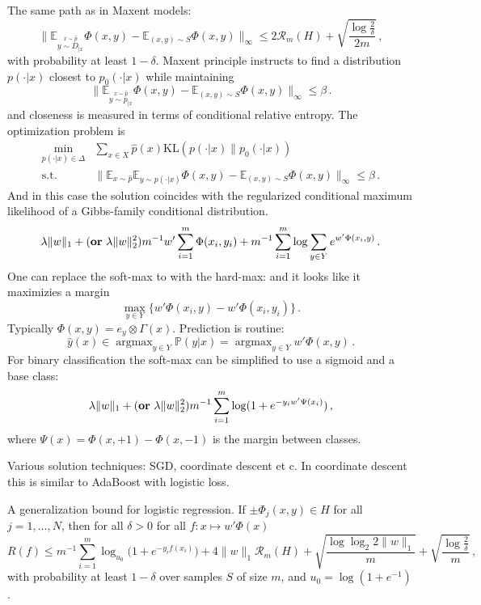 \documentclass[a4paper]{article}
\newcommand{\ex}{\mathbb{E}}
\newcommand{\pr}{\mathbb{P}}
\newcommand{\argmax}{\mathop{\text{argmax}}}
\begin{document}
The same path as in Maxent models:
\[ \| \ex_{\stackrel{x\sim\hat{p}}{y\sim D_{|x}}} \Phi(x, y)
     - \ex_{(x, y)\sim S} \Phi(x, y) \|_\infty
     \leq 2\mathcal{R}_m(H) + \sqrt{\frac{\log\frac{2}{\delta}}{2m}} \,,
     \]
with probability at least $1-\delta$. Maxent principle instructs to find a distribution
$p(\cdot|x)$ closest to $p_0(\cdot|x)$ while maintaining
\[ \| \ex_{\stackrel{x\sim\hat{p}}{y\sim p_{|x}}} \Phi(x, y)
     -\ex_{(x, y)\sim S} \Phi(x, y) \|_\infty \leq \beta \,. \]
and closeness is measured in terms of conditional relative entropy. The optimization
problem is
\begin{align*}
    \min_{p(\cdot|x)\in \Delta} &\sum_{x\in X}\hat{p}(x) \text{KL}(p(\cdot|x)\|p_0(\cdot|x)) \\
    \text{s.t.} & \|\ex_{x\sim \hat{p}} \ex_{y\sim p(\cdot|x)} \Phi(x, y)
        - \ex_{(x, y)\sim S} \Phi(x, y)\|_\infty \leq \beta \,.
\end{align*}
And in this case the solution coincides with the regularized conditional maximum
likelihood of a Gibbs-family conditional distribution.
\begin{align*}
    \lambda \|w\|_1 + (\text{\textbf{or} } \lambda \|w\|^2_2)
    m^{-1} w' \sum_{i=1}^m \Phi(x_i, y_i) + 
    m^{-1} \sum_{i=1}^m \log\sum_{y\in Y} e^{w'\Phi(x_i, y)} \,.
\end{align*}
One can replace the soft-max to with the hard-max: and it looks like it maximizies
a margin
\[ \max_{y\in Y}\bigl\{ w'\Phi(x_i, y) - w'\Phi(x_i, y_i) \bigr\} \,. \]
Typically $\Phi(x, y) = e_y \otimes \Gamma(x)$. Prediction is routine:
\[ \hat{y}(x) 
    \in \argmax_{y\in Y}\pr(y|x) 
    = \argmax_{y\in Y} w'\Phi(x, y)
    \,. \] 
For binary classification the soft-max can be simplified to use a sigmoid and a base
class:
\begin{align*}
    \lambda \|w\|_1 + (\text{\textbf{or} } \lambda \|w\|^2_2)
    m^{-1} \sum_{i=1}^m \log (1 + e^{-y_i w'\Psi(x_i)}) \,,
\end{align*}
where $\Psi(x) = \Phi(x, +1) - \Phi(x, -1)$ is the margin between classes.

Various solution techniques: SGD, coordinate descent et c. In coordinate descent
this is similar to AdaBoost with logistic loss.

A generalization bound for logistic regression. If $\pm \Phi_j(x, y) \in H$ for
all $j=1,\ldots, N$, then for all $\delta>0$ for all $f:x\mapsto w'\Phi(x)$
\[ R(f) \leq m^{-1} \sum_{i=1}^m \log_{u_0} \bigl(1+e^{-y_i f(x_i)}\bigr)
    + 4 \|w\|_1 \mathcal{R}_m(H) + \sqrt{\frac{\log\log_2 2\|w\|_1}{m}}
    + \sqrt{\frac{\log \frac{2}{\delta}}{m}}
    \,, \]
with probability at least $1-\delta$ over samples $S$ of size $m$, and $u_0 = \log(1+e^{-1})$.
\end{document}
